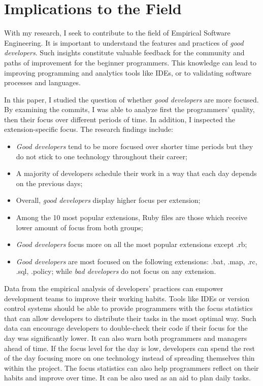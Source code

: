 
\chapter{Implications to the Field}\label{chapter:implications}

With my research, I seek to contribute to the field of Empirical Software Engineering. It is important to understand the features and practices of \textit{good developers}. Such insights constitute valuable feedback for the community and paths of improvement for the beginner programmers. This knowledge can lead to improving programming and analytics tools like IDEs, or to validating software processes and languages. \par

In this paper, I studied the question of whether \textit{good developers} are more focused. By examining  the commits, I was able to analyze first the programmers’ quality, then their focus over different periods of time. In addition, I inspected the extension-specific focus. The research findings include:
\begin{itemize}
\item \textit{Good developers} tend to be more focused over shorter time periods but they do not stick to one technology throughout their career;
\item A majority of developers schedule their work in a way that each day depends on the previous days;
\item Overall, \textit{good developers} display higher focus per extension;
\item Among the 10 most popular extensions, Ruby files are those which receive lower amount of  focus from both groups;
\item \textit{Good developers} focus more on all the most popular extensions except .rb;
\item \textit{Good developers} are most focused on the following extensions:  .bat, .map, .rc, .sql, .policy; while \textit{bad developers} do not focus on any extension.
\end{itemize}

Data from the empirical analysis of developers’ practices can empower development teams to improve their working habits. Tools like IDEs or version control systems should be able to provide programmers with the focus statistics that can allow developers to distribute their tasks in the most optimal way. Such data can encourage developers to double-check their code if their focus for the day was significantly lower. It can also warn both programmers and managers ahead of time. If the focus level for the day is low, developers can spend the rest of the day focusing more on one technology instead of spreading themselves thin within the project. The focus statistics can also help programmers reflect on their habits and improve over time. It can be also used as an aid to plan daily tasks. \par

